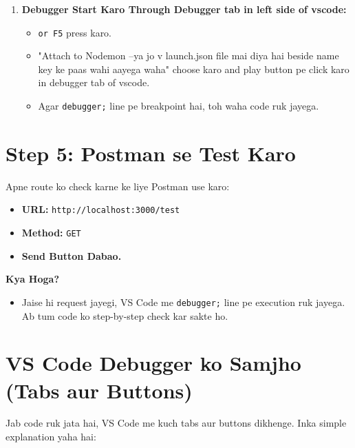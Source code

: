 \documentclass[a4paper,12pt]{article}
\begin{document}
\begin{enumerate}
\begin{itemize}
    \end{itemize}
    \item \textbf{\color{myblue}Debugger Start Karo Through Debugger tab in left side of vscode:}  
    \begin{itemize}
        \item \texttt{\color{mygreen}or F5} press karo.
        \item "Attach to Nodemon --ya jo v launch.json file mai diya hai beside name key ke paas wahi aayega waha" choose karo and play button pe click karo in debugger tab of vscode.
        \item Agar \texttt{\color{mygreen}debugger;} line pe breakpoint hai, toh waha code ruk jayega.
    \end{itemize}
\end{enumerate}

\section{Step 5: Postman se Test Karo}
Apne route ko check karne ke liye Postman use karo:  
\begin{itemize}
    \item \textbf{\color{myblue}URL:} \texttt{\color{mygreen}http://localhost:3000/test}
    \item \textbf{\color{myblue}Method:} \texttt{\color{mygreen}GET}
    \item \textbf{\color{myblue}Send Button Dabao.}
\end{itemize}

\textbf{\color{myblue}Kya Hoga?}  
\begin{itemize}
    \item Jaise hi request jayegi, VS Code me \texttt{\color{mygreen}debugger;} line pe execution ruk jayega. Ab tum code ko step-by-step check kar sakte ho.
\end{itemize}

\section{ VS Code Debugger ko Samjho (Tabs aur Buttons)}
Jab code ruk jata hai, VS Code me kuch tabs aur buttons dikhenge. Inka simple explanation yaha hai:
\end{document}
